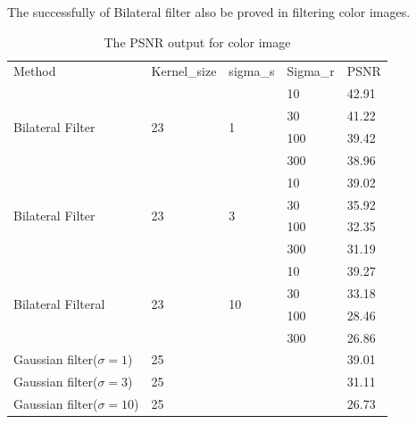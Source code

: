 \documentclass[12pt]{article}
\begin{document}
%

The successfully of Bilateral filter also be proved in filtering color images.

\begin{table}[H]
  \centering
  \begin{tabular}{lllll}
  \cline{1-5}
  Method & Kernel\_size & sigma\_s & Sigma\_r & PSNR  \\ \cline{1-1}
  \cline{1-5}
  \multirow{4}{*}{Bilateral Filter}   & \multirow{4}{*}{23} & \multirow{4}{*}{1}                               
                                    & 10      & 42.91 \\
         &             &            & 30      & 41.22     \\
         &             &            & 100     & 39.42     \\
         &             &            & 300     & 38.96     \\
  \cline{1-5}
  \multirow{4}{*}{Bilateral Filter}   & \multirow{4}{*}{23} & \multirow{4}{*}{3}  
                                    & 10       &39.02    \\
        &              &            & 30       &35.92   \\
        &              &            & 100      &32.35    \\
        &              &            & 300      &31.19     \\
  \cline{1-5}                                 
  \multirow{4}{*}{Bilateral Filteral} & \multirow{4}{*}{23} & \multirow{4}{*}{10} 
                                    & 10       & 39.27    \\
       &               &            & 30       & 33.18     \\
       &               &            & 100      & 28.46    \\
       &               &            & 300      & 26.86     \\
  \cline{1-5}
Gaussian filter($\sigma = 1$)      & 25 &  & & 39.01     \\
Gaussian filter($\sigma = 3$)      & 25 &  & & 31.11     \\
Gaussian filter($\sigma = 10$)     & 25 &  & & 26.73    
\end{tabular}
\caption{The PSNR output for color image}
\label{table_PSNR)color}
\end{table}
\end{document}
